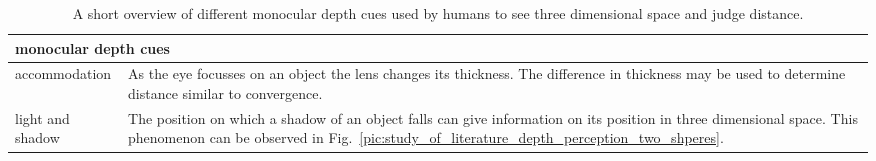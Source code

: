 \begin{table}[h!]
	\begin{tabularx}{\textwidth}{|l|X|}
		\hline
		\multicolumn{2}{|l|}{\textbf{monocular depth cues}} \\
		\hline
		accommodation & As the eye focusses on an object the lens changes its thickness. The difference in thickness may be used to determine distance similar to convergence.
		\\
		\hline
		light and shadow & The position on which a shadow of an object falls can give information on its position in three dimensional space. This phenomenon can be observed in Fig.~\ref{pic:study_of_literature_depth_perception_two_shperes}.
		\\
		\hline
	\end{tabularx}
	\label{tab:study_of_literature_monocular_depth_cues1}
	\caption{A short overview of different monocular depth cues used by humans to see three dimensional space and judge distance.}
\end{table}


